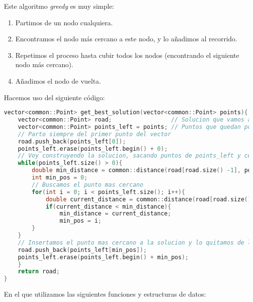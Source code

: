 \documentclass[10pt, a4paper]{article}
\theoremstyle{theorem-style}
\theoremstyle{theorem-style}
\theoremstyle{definition-style}
\theoremstyle{remark-style}
\theoremstyle{example-style}
\theoremstyle{definition-style}
\theoremstyle{remark-style}
\begin{document}
Este algoritmo \emph{greedy} es muy simple:

\begin{enumerate}
	\item Partimos de un nodo cualquiera.
	\item Encontramos el nodo más cercano a este nodo, y lo añadimos al recorrido.
	\item Repetimos el proceso hasta cubir todos los nodos (encontrando el siguiente nodo más cercano).
	\item Añadimos el nodo de vuelta.
\end{enumerate}

Hacemos uso del siguiente código:

\begin{lstlisting}[language=C]
vector<common::Point> get_best_solution(vector<common::Point> points){
	vector<common::Point> road;                 // Solucion que vamos a construir
	vector<common::Point> points_left = points; // Puntos que quedan por insertar a la solucion
	// Parto siempre del primer punto del vector
	road.push_back(points_left[0]);
	points_left.erase(points_left.begin() + 0);
	// Voy construyendo la solucion, sacando puntos de points_left y colocandolos en road
	while(points_left.size() > 0){
		double min_distance = common::distance(road[road.size() -1], points_left[0]);
		int min_pos = 0;
		// Buscamos el punto mas cercano
		for(int i = 0; i < points_left.size(); i++){
			double current_distance = common::distance(road[road.size() -1], points_left[i]);
			if(current_distance < min_distance){
				min_distance = current_distance;
				min_pos = i;
		}
	}
	// Insertamos el punto mas cercano a la solucion y lo quitamos de los puntos que faltan
	road.push_back(points_left[min_pos]);
	points_left.erase(points_left.begin() + min_pos);
	}
	return road;
}
\end{lstlisting}

En el que utilizamos las siguientes funciones y estructuras de datos:
\end{document}
